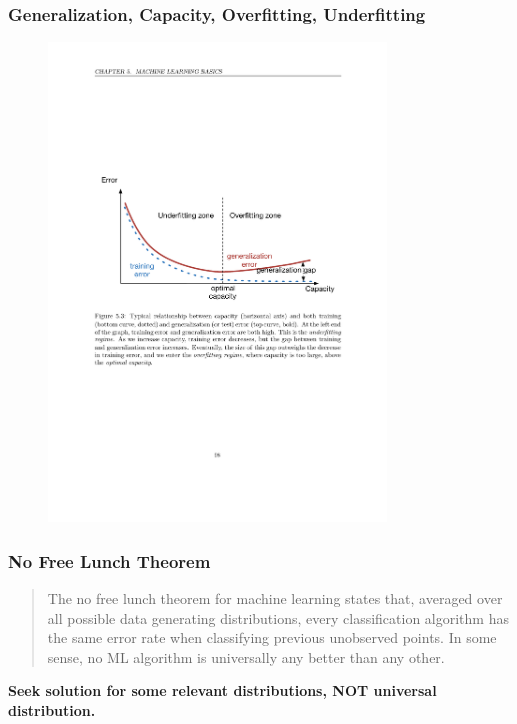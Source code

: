 \documentclass{beamer}
\begin{document}
\begin{frame}
  \frametitle{Generalization, Capacity, Overfitting, Underfitting}

  \begin{figure}
    \centering
    \includegraphics[width=0.8\textwidth]{relationships_between_terms.pdf}
  \end{figure}
\end{frame}

\begin{frame}
  \frametitle{No Free Lunch Theorem}

  \begin{quote}
    The no free lunch theorem for machine learning \cite{Wolpert:1996} states that, averaged over all possible data generating distributions, every classification algorithm has the same error rate when classifying previous unobserved points. In some sense, no ML algorithm is universally any better than any other.
  \end{quote}

  \centering
  \textbf{Seek solution for some relevant distributions, NOT universal distribution.}
\end{frame}
\end{document}
